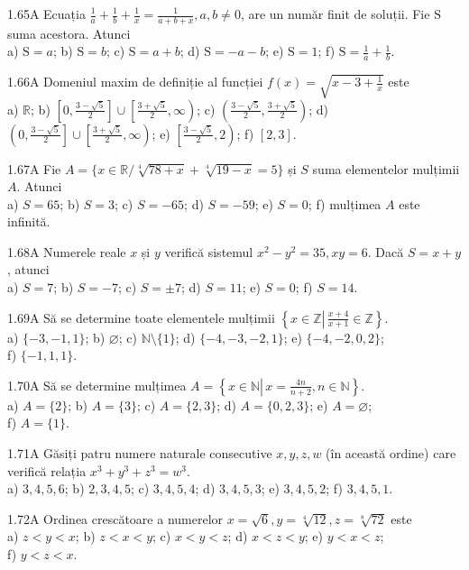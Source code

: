 \documentclass[11pt]{article}
\begin{document}
1.65A Ecuația $\frac{1}{a}+\frac{1}{b}+\frac{1}{x}=\frac{1}{a+b+x}, a, b \neq 0$, are un număr finit de soluții. Fie $\mathrm{S}$ suma acestora. Atunci\\ a) $\mathrm{S}=a$; b) $\mathrm{S}=b$; c) $\mathrm{S}=a+b$; d) $\mathrm{S}=-a-b$; e) $\mathrm{S}=1$; f) $\mathrm{S}=\frac{1}{a}+\frac{1}{b}$.

1.66A Domeniul maxim de definiție al funcției $f(x)=\sqrt{x-3+\frac{1}{x}}$ este\\ a) $\mathbb{R}$; b) $\left[0, \frac{3-\sqrt{5}}{2}\right] \cup\left[\frac{3+\sqrt{5}}{2}, \infty\right)$; c) $\left(\frac{3-\sqrt{5}}{2}, \frac{3+\sqrt{5}}{2}\right)$; d) $\left(0, \frac{3-\sqrt{5}}{2}\right] \cup\left[\frac{3+\sqrt{5}}{2}, \infty\right)$; e) $\left[\frac{3-\sqrt{5}}{2}, 2\right)$; f) $[2,3]$.

1.67A Fie $A=\{x \in \mathbb{R} / \sqrt[4]{78+x}+\sqrt[4]{19-x}=5\}$ și $S$ suma elementelor mulțimii $A$. Atunci\\ a) $S=65$; b) $S=3$; c) $S=-65$; d) $S=-59$; e) $S=0$; f) mulțimea $A$ este infinită.

1.68A Numerele reale $x$ și $y$ verifică sistemul $x^{2}-y^{2}=35, x y=6$. Dacă $S=x+y$, atunci\\ a) $S=7$; b) $S=-7$; c) $S= \pm 7$; d) $S=11$; e) $S=0$; f) $S=14$.

1.69A Să se determine toate elementele mulțimii $\left\{x \in \mathbb{Z} \left\lvert\, \frac{x+4}{x+1} \in \mathbb{Z}\right.\right\}$.\\ a) $\{-3,-1,1\}$; b) $\varnothing$; c) $\mathbb{N} \setminus\{1\}$; d) $\{-4,-3,-2,1\}$; e) $\{-4,-2,0,2\}$;\\ f) $\{-1,1,1\}$.

1.70A Să se determine mulțimea $A=\left\{x \in \mathbb{N} \left\lvert\, x=\frac{4 n}{n+2}\right., n \in \mathbb{N}\right\}$.\\ a) $A=\{2\}$; b) $A=\{3\}$; c) $A=\{2,3\}$; d) $A=\{0,2,3\}$; e) $A=\varnothing$;\\ f) $A=\{1\}$.

1.71A Găsiți patru numere naturale consecutive $x, y, z, w$ (în această ordine) care verifică relația $x^{3}+y^{3}+z^{3}=w^{3}$.\\ a) $3,4,5,6$; b) $2,3,4,5$; c) $3,4,5,4$; d) $3,4,5,3$; e) $3,4,5,2$; f) $3,4,5,1$.

1.72A Ordinea crescătoare a numerelor $x=\sqrt{6}, y=\sqrt[4]{12}, z=\sqrt[8]{72}$ este\\ a) $z<y<x$; b) $z<x<y$; c) $x<y<z$; d) $x<z<y$; e) $y<x<z$;\\ f) $y<z<x$.
\end{document}
